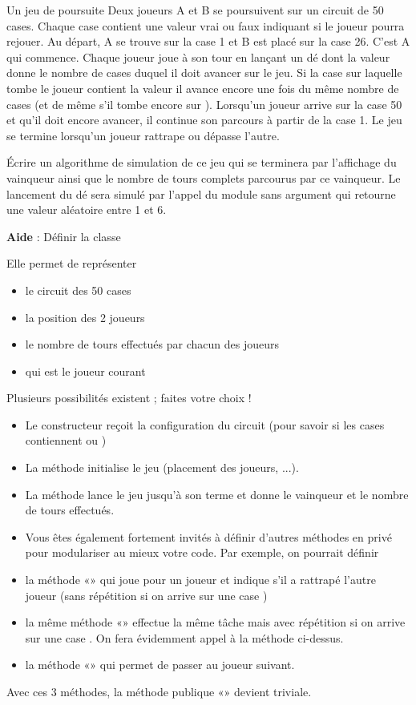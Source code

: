 \begin{Exercice}{Un jeu de poursuite}
	Deux joueurs A et B se poursuivent sur un
	circuit de 50 cases. Chaque case contient une valeur vrai ou faux
	indiquant si le joueur pourra rejouer.
	Au départ, A se trouve sur la case 1 et B est placé sur la case 26.
	C’est A qui commence. Chaque joueur joue à son tour en lançant un dé
	dont la valeur donne le nombre de cases duquel il doit avancer sur le
	jeu. Si la case sur laquelle tombe le joueur contient la valeur
	 il avance encore
	une fois du même nombre de cases (et de même s’il tombe encore sur
	). Lorsqu’un joueur
	arrive sur la case 50 et qu’il doit encore avancer, il continue son
	parcours à partir de la case 1. Le jeu se termine lorsqu’un joueur
	rattrape ou dépasse l’autre.

	Écrire un algorithme de simulation de ce jeu
	qui se terminera par l’affichage du vainqueur ainsi que le nombre de
	tours complets parcourus par ce vainqueur. 
	Le lancement du dé sera simulé par l’appel du module sans argument
	 qui retourne
	une valeur aléatoire entre 1 et 6.

	\textbf{Aide} :	Définir la classe
	
	Elle permet de représenter
	\begin{itemize}
		\item 
			le circuit des 50 cases
		\item 
			la position des 2 joueurs
		\item 
			le nombre de tours effectués par chacun des joueurs
		\item 
			qui est le joueur courant
	\end{itemize}
	Plusieurs possibilités existent ; faites votre choix !
	\begin{itemize}
		\item 
			Le constructeur reçoit la configuration du circuit (pour savoir si les
			cases contiennent  ou
			)
		\item 
			La méthode  initialise le jeu
			(placement des joueurs, ...).
		\item 
			La méthode  lance le jeu jusqu’à son terme et
			donne le vainqueur et le nombre de tours effectués.
		\item 
			Vous êtes également fortement invités à définir d’autres méthodes en
			privé pour modulariser au mieux votre code. Par exemple, on pourrait
			définir
		\item 
			la méthode «» qui joue pour un joueur et
			indique s'il a rattrapé l’autre joueur (sans
			répétition si on arrive sur une case )
		\item 
			la même méthode «» effectue la même tâche
			mais avec répétition si on arrive sur une case
			. On fera évidemment appel à la méthode
			ci-dessus.
		\item 
			la méthode «» qui permet de passer au
			joueur suivant.
	\end{itemize}
	
	Avec ces 3 méthodes, la méthode publique
	«» devient triviale.
\end{Exercice}


